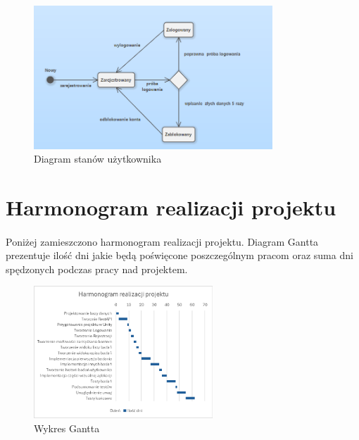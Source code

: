\documentclass[12pt, letterpaper]{article}
\begin{document}
\begin{figure}[h]
  \centering
      \includegraphics[width=0.8\textwidth]{activeDiagramUser}
  \caption{Diagram stanów użytkownika}
\end{figure}
		
		
\newpage
\section{Harmonogram realizacji projektu}
\paragraph{}
Poniżej zamieszczono harmonogram realizacji projektu. Diagram Gantta prezentuje ilość dni jakie będą poświęcone poszczególnym pracom oraz suma dni spędzonych podczas pracy nad projektem.
		
\begin{figure}[h]
  \centering
      \includegraphics[width=0.6\textwidth]{wykres_gantta}
  \caption{Wykres Gantta}
\end{figure}
		
\newpage
\end{document}
